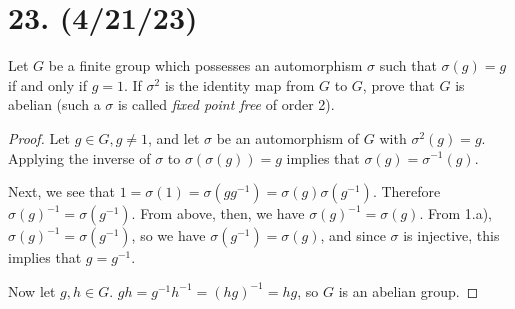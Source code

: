 \documentclass{article}
\begin{document}
\section*{23. (4/21/23)}

Let $G$ be a finite group which possesses an automorphism $\sigma$ such that $\sigma(g) = g$ if and only if $g = 1$. If $\sigma^2$ is the identity map from $G$ to $G$, prove that $G$ is abelian (such a $\sigma$ is called \emph{fixed point free} of order 2).

\begin{proof}
    Let $g \in G, g \neq 1$, and let $\sigma$ be an automorphism of $G$ with $\sigma^2(g) = g$. Applying the inverse of $\sigma$ to $\sigma(\sigma(g)) = g$ implies that $\sigma(g) = \sigma^{-1}(g)$.

    Next, we see that $1 = \sigma(1) = \sigma(g g^{-1}) = \sigma(g) \sigma(g^{-1})$. Therefore $\sigma(g)^{-1} = \sigma(g^{-1})$. From above, then, we have $\sigma(g)^{-1} = \sigma(g)$. From 1.a), $\sigma(g)^{-1} = \sigma(g^{-1})$, so we have $\sigma(g^{-1}) = \sigma(g)$, and since $\sigma$ is injective, this implies that $g = g^{-1}$.

    Now let $g, h \in G$. $gh = g^{-1}h^{-1} = (hg)^{-1} = hg$, so $G$ is an abelian group.
\end{proof}
\end{document}
